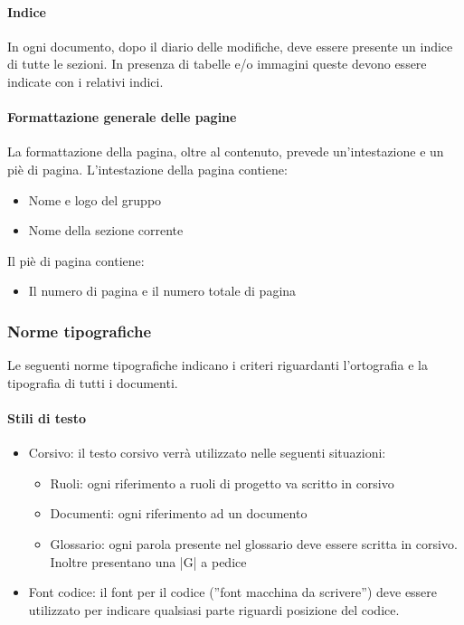 \paragraph{Indice}

In ogni documento, dopo il diario delle modifiche, deve essere presente un indice di tutte le
sezioni. In presenza di tabelle e/o immagini queste devono essere indicate con i relativi indici.

\paragraph{Formattazione generale delle pagine}

La formattazione della pagina, oltre al contenuto, prevede un'intestazione e un piè di pagina.
L'intestazione della pagina contiene:
\begin{itemize}
\item Nome e logo del gruppo
\item Nome della sezione corrente
\end{itemize}

Il piè di pagina contiene:
\begin{itemize} 
\item Il numero di pagina e il numero totale di pagina
\end{itemize}

\subsubsection{Norme tipografiche}

Le seguenti norme tipografiche indicano i criteri riguardanti l'ortografia e la tipografia di tutti i documenti.

\paragraph{Stili di testo}

\begin{itemize}
\item Corsivo: il testo corsivo verrà utilizzato nelle seguenti situazioni:

  \begin{itemize}
  \item  Ruoli: ogni riferimento a ruoli di progetto va scritto in corsivo
  \item  Documenti: ogni riferimento ad un documento
  \item  Glossario: ogni parola presente nel glossario deve essere scritta in corsivo. Inoltre presentano una |G| a pedice
  \end{itemize}

\item Font codice: il font per il codice (''font macchina da scrivere'') deve essere utilizzato per indicare qualsiasi parte riguardi posizione del codice.
\end{itemize}

